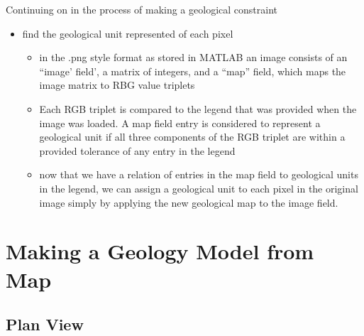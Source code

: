 Continuing on in the process of making a geological constraint
\begin{itemize}
\item find the geological unit represented of each pixel
\begin{itemize}
	\item in the .png style format as stored in MATLAB an image consists of an ``image' field', a matrix of integers, and a ``map'' field, which maps the image matrix to RBG value triplets
	\item Each RGB triplet is compared to the legend that was provided when the image was loaded. A map field entry is considered to represent a geological unit if all three components of the RGB triplet are within a provided tolerance of any entry in the legend
	\item now that we have a relation of entries in the map field to geological units in the legend, we can assign a geological unit to each pixel in the original image simply by applying the new geological map to the image field.
\end{itemize}
\end{itemize}



\section{Making a Geology Model from Map}
\label{sec:Make Geology Model from Map}

\subsection{Plan View}
\label{subsec:Make Geology Model from Map Plan View}

